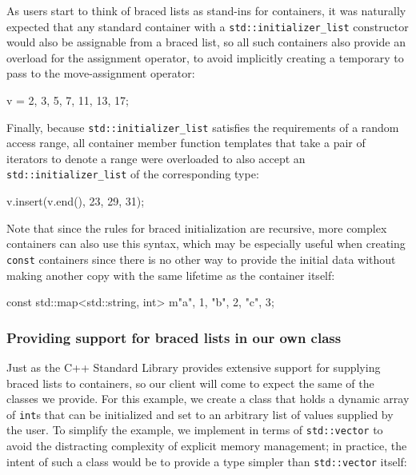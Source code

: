 As users start to think of braced lists as stand-ins for containers, it
was naturally expected that any standard container with a
\lstinline!std::initializer_list! constructor would also be assignable
from a braced list, so all such containers also provide an overload for
the assignment operator, to avoid implicitly creating a temporary to
pass to the move-assignment operator:

\begin{emcppslisting}
v = {2, 3, 5, 7, 11, 13, 17};
\end{emcppslisting}
    

\noindent Finally, because \lstinline!std::initializer_list! satisfies the
requirements of a random access range, all container member function
templates that take a pair of iterators to denote a range were
overloaded to also accept an \lstinline!std::initializer_list! of the
corresponding type:

\begin{emcppslisting}
v.insert(v.end(), {23, 29, 31});
\end{emcppslisting}
    

\noindent Note that since the rules for braced initialization are recursive, more
complex containers can also use this syntax, which may be especially
useful when creating \lstinline!const! containers since there is no other
way to provide the initial data without making another copy with the
same lifetime as the container itself:

\begin{emcppslisting}
const std::map<std::string, int> m{{"a", 1}, {"b", 2}, {"c", 3}};
\end{emcppslisting}
    

\subsubsection[Providing support for braced lists in our own class]{Providing support for braced lists in our own class}\label{providing-support-for-braced-lists-in-our-own-class}

Just as the C++ Standard Library provides extensive support for
supplying braced lists to containers, so our client will come to expect
the same of the classes we provide. For this example, we create a class
that holds a dynamic array of \lstinline!int!s that can be initialized and
set to an arbitrary list of values supplied by the user. To simplify the
example, we implement in terms of \lstinline!std::vector! to avoid the
distracting complexity of explicit memory management; in practice, the
intent of such a class would be to provide a type simpler than
\lstinline!std::vector! itself:


